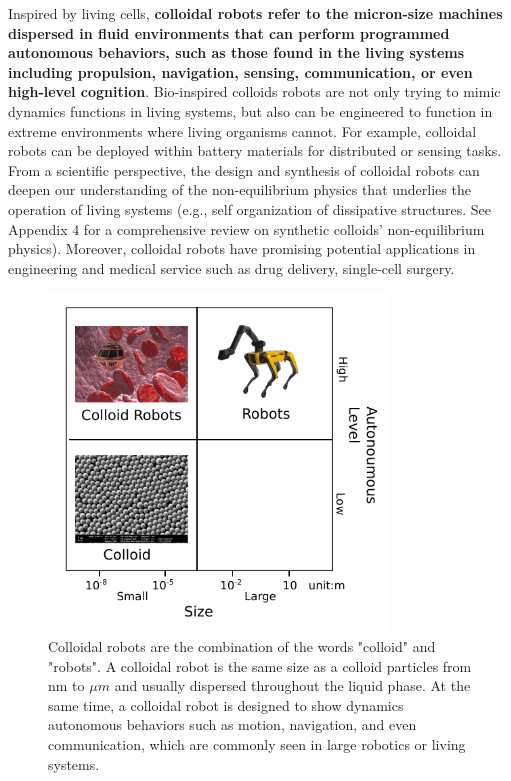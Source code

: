 Inspired by living cells, \textbf{colloidal robots refer to the micron-size machines  dispersed in fluid environments that can perform  programmed autonomous behaviors, such as those found in the living systems including propulsion, navigation, sensing, communication, or even high-level cognition}. Bio-inspired colloids robots are not only trying to mimic dynamics functions in living systems, but also can be engineered to function in extreme environments where living organisms cannot. For example, colloidal robots can be deployed within battery materials for distributed or sensing tasks. From a scientific perspective, the design and synthesis of colloidal robots can deepen our understanding of the non-equilibrium physics that underlies the operation of living systems (e.g., self organization of dissipative structures. See Appendix 4 for a comprehensive review on  synthetic colloids' non-equilibrium physics). Moreover, colloidal robots have promising potential applications in engineering and medical service such as drug delivery\autocite{fu2012controlled,de2017micromotor}, single-cell surgery\autocite{li2017micro}. 

\begin{figure}
\centering
\includegraphics[width=9cm]{figures/1_1.pdf}
\caption{Colloidal robots are the combination of the words "colloid" and "robots". A colloidal robot is the same size as a colloid particles from nm to $\mu m$ and usually dispersed throughout the liquid phase. At the same time, a colloidal robot is designed to show dynamics autonomous behaviors such as motion, navigation, and even communication, which are commonly seen in large robotics or living systems.}
\label{fig:1.1}
\end{figure}


